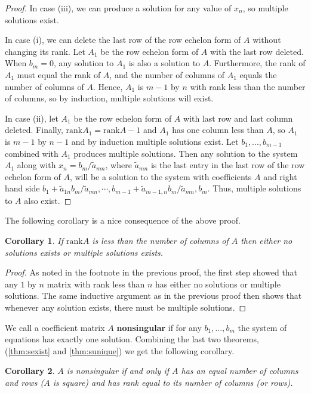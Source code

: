 \documentclass[12pt,reqno]{amsart}
\newcommand{\rank}{\mathrm{rank}}
\newtheorem{corollary}{Corollary}[section]
\theoremstyle{definition}
\begin{document}
\begin{proof}
  In case (iii), we can produce a solution for any value of $x_n$, so
  multiple solutions exist.

  In case (i), we can delete the last row of the row echelon form of
  $A$ without changing its rank. Let $A_1$ be the row echelon form of
  $A$ with the last row deleted. When $b_m = 0$, any solution to $A_1$
  is also a solution to $A$. Furthermore, the rank of $A_1$ must equal
  the rank of $A$, and the number of columns of $A_1$ equals the
  number of columns of $A$. Hence, $A_1$ is $m-1$ by $n$ with rank
  less than the number of columns, so by induction, multiple solutions
  will exist.

  In case (ii), let $A_1$ be the row echelon form of $A$ with last row
  and last column deleted.  Finally, $\rank A_1 = \rank A - 1$ and
  $A_1$ has one column less than $A$, so $A_1$ is $m-1$ by $n-1$ and
  by induction multiple solutions exist. Let $b_1, ..., b_{m-1}$
  combined with $A_1$ produces multiple solutions. Then any solution
  to the system $A_1$ along with $x_{n} = b_m/\tilde{a}_{mn}$, where
  $\tilde{a}_{mn}$ is the last entry in the last row of the row
  echelon form of $A$, will be a solution to the system with
  coefficients $A$ and right hand side $b_1 + \tilde{a}_{1n}
  b_m/\tilde{a}_{mn}, \cdots , b_{m-1} + \tilde{a}_{m-1,n}
  b_m/\tilde{a}_{mn} , b_m$. Thus, multiple solutions to $A$ also
  exist.
\end{proof}
The following corollary is a nice consequence of the above proof.
\begin{corollary}\label{cor:smult}
  If $\rank A$ is less than the number of columns of $A$ then either
  no solutions exists or multiple solutions exists. 
\end{corollary}
\begin{proof}
  As noted in the footnote in the previous proof, the first step
  showed that any $1$ by $n$ matrix with rank less than $n$ has either
  no solutions or multiple solutions. The same inductive argument as
  in the previous proof then shows that whenever any solution exists,
  there must be multiple solutions. 
\end{proof}

We call a coefficient matrix $A$ \textbf{nonsingular} if for any $b_1,
..., b_m$ the system of equations has exactly one solution. Combining
the last two theorems, (\ref{thm:sexist} and \ref{thm:sunique}) we get
the following corollary.
\begin{corollary}
  $A$ is nonsingular if and only if $A$ has an equal number of columns
  and rows ($A$ is square) and has rank equal to its number of columns
  (or rows).
\end{corollary}
\end{document}
